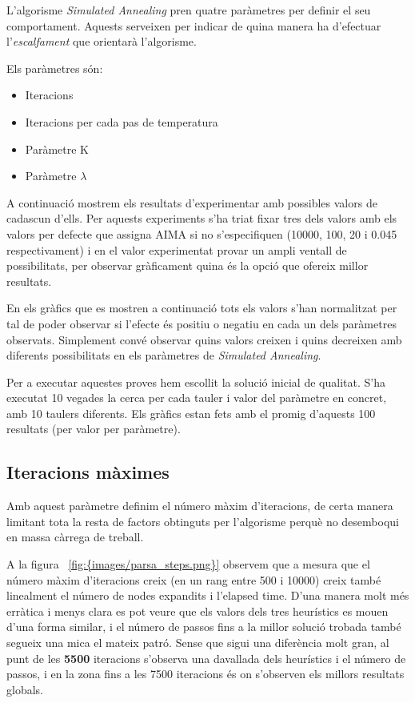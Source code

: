 
L'algorisme \emph{Simulated Annealing} pren quatre paràmetres per definir el seu comportament. Aquests serveixen per indicar de quina manera ha d'efectuar l'\emph{escalfament} que orientarà l'algorisme.

Els paràmetres són:

\begin{itemize}
	\item Iteracions
	\item Iteracions per cada pas de temperatura
	\item Paràmetre K
	\item Paràmetre $\lambda$
\end{itemize}

A continuació mostrem els resultats d'experimentar amb possibles valors de cadascun d'ells. Per aquests experiments s'ha triat fixar tres dels valors amb els valors per defecte que assigna AIMA si no s'especifiquen (10000, 100, 20 i 0.045 respectivament) i en el valor experimentat provar un ampli ventall de possibilitats, per observar gràficament quina és la opció que ofereix millor resultats.

En els gràfics que es mostren a continuació tots els valors s'han normalitzat per tal de poder observar si l'efecte és positiu o negatiu en cada un dels paràmetres observats. Simplement convé observar quins valors creixen i quins decreixen amb diferents possibilitats en els paràmetres de \emph{Simulated Annealing}.

Per a executar aquestes proves hem escollit la solució inicial de qualitat. S'ha executat 10 vegades la cerca per cada tauler i valor del paràmetre en concret, amb 10 taulers diferents. Els gràfics estan fets amb el promig d'aquests 100 resultats (per valor per paràmetre).

\newpage
\subsection{Iteracions màximes} %
\label{sub:iteracions}

Amb aquest paràmetre definim el número màxim d'iteracions, de certa manera limitant tota la resta de factors obtinguts per l'algorisme perquè no desemboqui en massa càrrega de treball.


A la figura ~\ref{fig:{images/parsa_steps.png}} observem que a mesura que el número màxim d'iteracions creix (en un rang entre 500 i 10000) creix també linealment el número de nodes expandits i l'elapsed time. D'una manera molt més erràtica i menys clara es pot veure que els valors dels tres heurístics es mouen d'una forma similar, i el número de passos fins a la millor solució trobada també segueix una mica el mateix patró. Sense que sigui una diferència molt gran, al punt de les \textbf{5500} iteracions s'observa una davallada dels heurístics i el número de passos, i en la zona fins a les 7500 iteracions és on s'observen els millors resultats globals.

